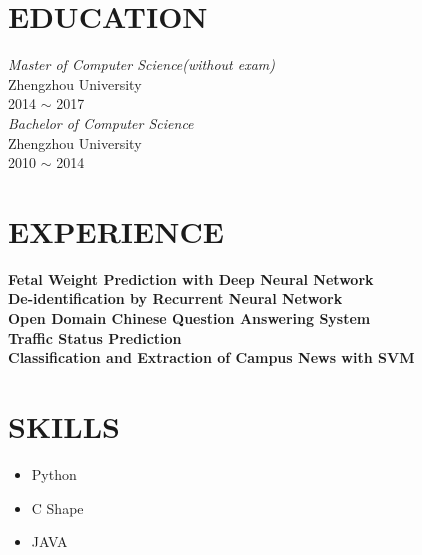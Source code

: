 \documentclass[line, margin]{res}
\begin{document}


\begin{resume}
\section{EDUCATION} 
 {\sl Master of Computer Science(without exam)} \\
 Zhengzhou University \\
 2014 $\sim$ 2017 \\
[15pt]
 {\sl Bachelor of Computer Science} \\
 Zhengzhou University \\
 2010 $\sim$ 2014
 
\section{EXPERIENCE}

 {\bf Fetal Weight Prediction with Deep Neural Network} \\
 {\bf De-identification by Recurrent Neural Network} \\
 {\bf Open Domain Chinese Question Answering System} \\
 {\bf Traffic Status Prediction} \\
 {\bf Classification and Extraction of Campus News with SVM} \\
 
\section{SKILLS}
\begin{itemize}
\item Python
\item C Shape
\item JAVA
\end{itemize}

\end{resume}
\end{document}

